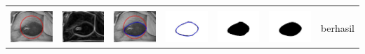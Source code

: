\begin{table}[H]
\begin{tabular}{|m{0.7in}|m{0.7in}|m{0.7in}|m{0.7in}|m{0.7in}|m{0.7in}|m{0.7in}|}
		&  &  & & & &  \\
		\includegraphics[width=0.7in]{dataset/dataset_3/luka_merah/ready/37_interp_init.jpg}&
		\includegraphics[width=0.7in]{dataset/dataset_3/luka_merah/ready/37_interp_ext.jpg}&
		\includegraphics[width=0.7in]{dataset/dataset_3/luka_merah/ready/37_interp_result.jpg}&
		\includegraphics[width=0.7in]{dataset/dataset_3/luka_merah/ready/37_gt_r.jpg}&
		\includegraphics[width=0.7in]{dataset/dataset_3/luka_merah/ready/37_r.jpg}&
		\includegraphics[width=0.7in]{dataset/dataset_3/luka_merah/ready/37_interp_r.jpg}&
		berhasil\\
		\hline
		

\end{tabular}
\end{table}
